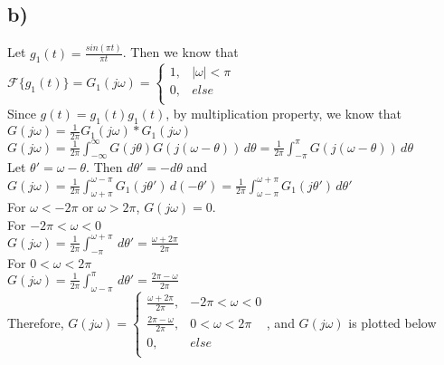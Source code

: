 \documentclass[12pt]{article}
\begin{document}
    \subsection*{b)}
    Let \(g_1(t) = \frac{sin(\pi t)}{\pi t}\). Then we know that \(\mathscr{F}\{g_1(t)\} = G_1(j\omega) = \begin{cases}
    1,& |\omega| < \pi\\
    0,& else\\
    \end{cases}\)\\
    Since \(g(t) = g_1(t)g_1(t)\), by multiplication property, we know that \(G(j\omega) = \frac{1}{2\pi}G_1(j\omega)*G_1(j\omega)\)\\
    \begin{math}
      G(j\omega) = \frac{1}{2\pi}\int_{-\infty}^{\infty} G(j\theta)G(j(\omega-\theta)) \,d\theta
      = \frac{1}{2\pi}\int_{-\pi}^{\pi} G(j(\omega-\theta)) \,d\theta 
    \end{math}\\
    Let \(\theta' = \omega - \theta\). Then \(d\theta' = -d\theta\) and\\
    \begin{math}
      G(j\omega) = \frac{1}{2\pi}\int_{\omega+\pi}^{\omega-\pi} G_1(j\theta') \,d(-\theta')
      = \frac{1}{2\pi}\int_{\omega-\pi}^{\omega+\pi} G_1(j\theta') \,d\theta'
    \end{math}\\
    For \(\omega < -2\pi\) or \(\omega > 2\pi\), \(G(j\omega) = 0\).\\
    For \(-2\pi < \omega < 0\)\\
    \begin{math}
      G(j\omega) = \frac{1}{2\pi}\int_{-\pi}^{\omega+\pi}  \,d\theta' = \frac{\omega+2\pi}{2\pi}
    \end{math}\\
    For \(0< \omega < 2\pi\)\\
    \begin{math}
      G(j\omega) = \frac{1}{2\pi}\int_{\omega-\pi}^{\pi}  \,d\theta' = \frac{2\pi-\omega}{2\pi}
    \end{math}\\
    Therefore, \(G(j\omega) =\begin{cases}
      \frac{\omega+2\pi}{2\pi},& -2\pi < \omega < 0\\
      \frac{2\pi-\omega}{2\pi},& 0 < \omega < 2\pi\\
      0,& else\\
      \end{cases}\), and \(G(j\omega)\) is plotted below\\
\end{document}
